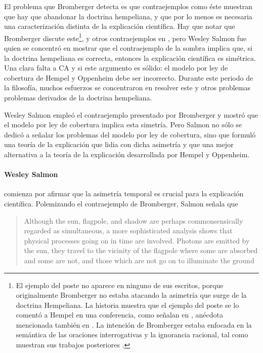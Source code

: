 El problema que Bromberger detecta es que
contraejemplos como éste muestran que hay que
abandonar la doctrina hempeliana, y que por lo menos
es necesaria una caracterización distinta de la
explicación científica. Hay que notar que Bromberger
discute este\footnote{
	El ejemplo del poste no aparece en ninguno de sus escritos, porque originalmente Bromberger no estaba atacando la asimetría que surge de	la doctrina Hempeliana. La historia muestra que el 	ejemplo del poste se lo comentó a Hempel en una	conferencia, como señalan en \parencite{mitBromberger}, anécdota mencionada también en	\parencite[p.~81]{Dewulf2022}. La intención de	Bromberger estaba enfocada en la semántica de las 	oraciones	interrogativas y la ignorancia racional, tal como muestran sus trabajos	posteriores \parencite{Bromberger1992}.
},
y otros contraejemplos en \parencite{Bromberger1966},
pero Wesley Salmon fue quien se concentró en mostrar
que el contraejemplo de la sombra implica que, si la
doctrina hempeliana es correcta, entonces la
explicación científica es simétrica. Una clara falta a
CA y si este argumento es sólido: el modelo por ley de
cobertura de Hempel y Oppenheim debe ser incorrecto.
Durante este periodo de la filosofía, muchos esfuerzos
se concentraron en resolver este y otros problemas
problemas derivados de la doctrina hempeliana.

Wesley Salmon empleó el contraejemplo presentado por
Bromberger y mostró que el modelo por ley de cobertura implica esta simetría. Pero Salmon no sólo se dedicó a señalar los problemas del modelo por ley de cobertura, sino que formuló una teoría de la explicación que lidia con dicha asimetría y que una mejor alternativa a la teoría de la explicación desarrollada por Hempel y Oppenheim.

\paragraph{Wesley Salmon \citeyear{Salmon1970}}
comienza por afirmar que la asimetría temporal es crucial
para la explicación científica. Polemizando el
contraejemplo de Bromberger, Salmon señala que

\begin{quote}
	Although the sun, flagpole, and shadow are perhaps
	commonsensically regarded as simultaneous, a more
	sophisticated analysis shows that physical processes
	going on in time are involved.	Photons are emitted by
	the sun, they travel to the	vicinity of the flagpole where
    some are absorbed and some are	not, and those which are
    not go on to  illuminate the ground \parencite[p.~72]{Salmon1970}
\end{quote}

